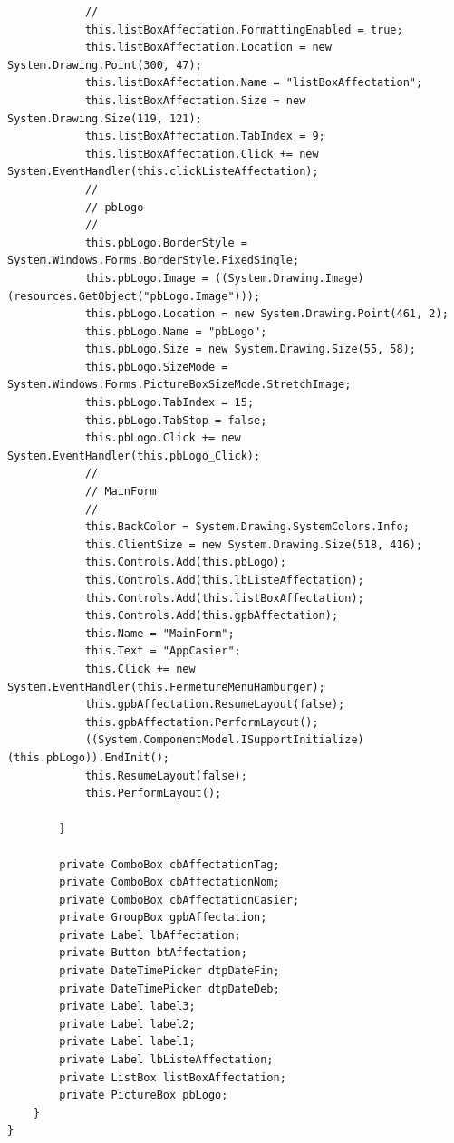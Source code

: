 \documentclass[main.tex]{subfiles}
\begin{document}
\begin{lstlisting}
            // 
            this.listBoxAffectation.FormattingEnabled = true;
            this.listBoxAffectation.Location = new System.Drawing.Point(300, 47);
            this.listBoxAffectation.Name = "listBoxAffectation";
            this.listBoxAffectation.Size = new System.Drawing.Size(119, 121);
            this.listBoxAffectation.TabIndex = 9;
            this.listBoxAffectation.Click += new System.EventHandler(this.clickListeAffectation);
            // 
            // pbLogo
            // 
            this.pbLogo.BorderStyle = System.Windows.Forms.BorderStyle.FixedSingle;
            this.pbLogo.Image = ((System.Drawing.Image)(resources.GetObject("pbLogo.Image")));
            this.pbLogo.Location = new System.Drawing.Point(461, 2);
            this.pbLogo.Name = "pbLogo";
            this.pbLogo.Size = new System.Drawing.Size(55, 58);
            this.pbLogo.SizeMode = System.Windows.Forms.PictureBoxSizeMode.StretchImage;
            this.pbLogo.TabIndex = 15;
            this.pbLogo.TabStop = false;
            this.pbLogo.Click += new System.EventHandler(this.pbLogo_Click);
            // 
            // MainForm
            // 
            this.BackColor = System.Drawing.SystemColors.Info;
            this.ClientSize = new System.Drawing.Size(518, 416);
            this.Controls.Add(this.pbLogo);
            this.Controls.Add(this.lbListeAffectation);
            this.Controls.Add(this.listBoxAffectation);
            this.Controls.Add(this.gpbAffectation);
            this.Name = "MainForm";
            this.Text = "AppCasier";
            this.Click += new System.EventHandler(this.FermetureMenuHamburger);
            this.gpbAffectation.ResumeLayout(false);
            this.gpbAffectation.PerformLayout();
            ((System.ComponentModel.ISupportInitialize)(this.pbLogo)).EndInit();
            this.ResumeLayout(false);
            this.PerformLayout();

        }

        private ComboBox cbAffectationTag;
        private ComboBox cbAffectationNom;
        private ComboBox cbAffectationCasier;
        private GroupBox gpbAffectation;
        private Label lbAffectation;
        private Button btAffectation;
        private DateTimePicker dtpDateFin;
        private DateTimePicker dtpDateDeb;
        private Label label3;
        private Label label2;
        private Label label1;
        private Label lbListeAffectation;
        private ListBox listBoxAffectation;
        private PictureBox pbLogo;
    }
}
\end{lstlisting}
\end{document}
